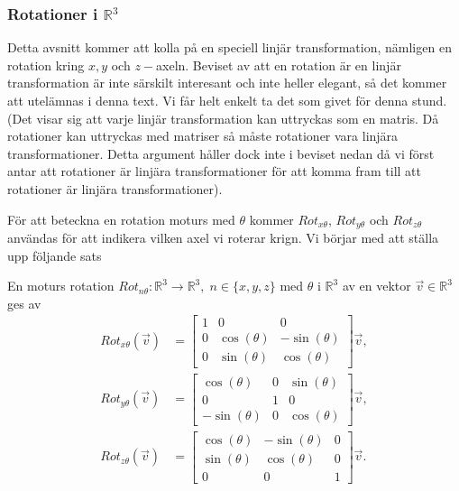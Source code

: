 \documentclass{article}
\theoremstyle{definition}
\begin{document}


\subsubsection{Rotationer i \texorpdfstring{$\mathbb{R}$$^3$}{}}
Detta avsnitt kommer att kolla på en speciell linjär transformation, nämligen en rotation
kring $x, y$ och $z-$axeln. Beviset av att en rotation är en linjär transformation är inte 
särskilt interesant och inte heller elegant, så det kommer att utelämnas i denna text. Vi får 
helt enkelt ta det som givet för denna stund. (Det visar sig att varje linjär transformation kan uttryckas som en matris. 
Då rotationer kan uttryckas med matriser så måste rotationer vara linjära transformationer. Detta argument håller dock inte i beviset nedan
då vi först antar att rotationer är linjära transformationer för att komma fram till att rotationer är linjära transformationer).

För att beteckna en rotation moturs med $\theta$ 
kommer $Rot_{x\theta}$, $Rot_{y\theta}$ och $Rot_{z\theta}$ användas för att indikera vilken 
axel vi roterar krign.
Vi börjar med att ställa upp följande sats

\hypertarget{sats5.3.2}{}
\begin{mytheo}{}{}
  En moturs rotation $Rot_{n\theta} : \mathbb{R}^3 \rightarrow \mathbb{R}^3, \; n \in \{x, y, z\}$ 
  med $\theta$ i $\mathbb{R}^3$ av en vektor $\vec{v} \in \mathbb{R}^3$ ges av 
  \begin{align}
    Rot_{x\theta} (\vec{v}) &= 
    \begin{bmatrix}
      1 & 0 & 0 \\
      0 & \cos(\theta) & -\sin(\theta) \\
      0 & \sin(\theta) & \cos(\theta)
    \end{bmatrix} \vec{v}, \\
    Rot_{y\theta} (\vec{v}) &= 
    \begin{bmatrix}
      \cos(\theta) & 0 & \sin(\theta) \\
      0 & 1 & 0 \\
      -\sin(\theta) & 0 & \cos(\theta)
    \end{bmatrix} \vec{v}, \\
    Rot_{z\theta} (\vec{v}) &= 
    \begin{bmatrix}
      \cos(\theta) & -\sin(\theta) & 0 \\
      \sin(\theta) & \cos(\theta) & 0 \\
      0 & 0 & 1
    \end{bmatrix} \vec{v}.
  \end{align}
\end{mytheo}
\end{document}
